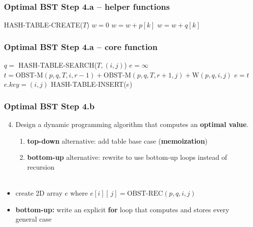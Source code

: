 \documentclass{beamer}
\newcommand{\stanza}{ \\~\ }
\begin{document}
\begin{frame} \frametitle{Optimal BST Step 4.a -- helper functions}
  {\scriptsize
  \begin{algorithmic}[1]
      \State HASH-TABLE-CREATE($T$)
      \State {}
    \EndFunction
      \State $w = 0$
        \State $w = w + p[k]$
      \EndFor
        \State $w = w + q[k]$
      \EndFor
      \State {}
    \EndFunction
  \end{algorithmic}
  }
\end{frame}

\begin{frame} \frametitle{Optimal BST Step 4.a -- core function}
  {\scriptsize
  \begin{algorithmic}[1]
    \State $q = $ HASH-TABLE-SEARCH($T, (i, j)$)
      \State {}
    \EndIf
      \State {}
    \EndIf
    \State $e = \infty$
      \State $t = \text{OBST-M}(p, q, T, i, r-1) + \text{OBST-M}(p, q, T, r+1, j) + \text{W}(p, q, i, j)$
        \State $e = t$
      \EndIf
    \EndFor
    \State $e.key = (i, j)$
    \State HASH-TABLE-INSERT($e$)
    \State {}
    \EndFunction
  \end{algorithmic}
  }
\end{frame}

\begin{frame} \frametitle{Optimal BST Step 4.b}
  \begin{enumerate}
    \setcounter{enumi}{3}
    \item Design a dynamic programming algorithm that computes an \textbf{optimal value}.
    \begin{enumerate}
      \item \textbf{top-down} alternative: add table base case (\textbf{memoization})
      \item \textbf{bottom-up} alternative: rewrite to use bottom-up loops instead of recursion
      \stanza
    \end{enumerate}
  \end{enumerate}
  \begin{itemize}
    \item create 2D array $e$ where $e[i][\, j] = \text{OBST-REC}(p, q, i, j)$
    \item \textbf{bottom-up:} write an explicit \textbf{for} loop that computes and stores every general case
  \end{itemize}
  \end{frame}
    
\end{document}
